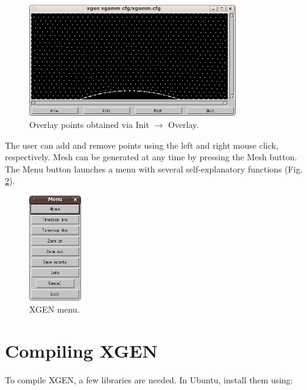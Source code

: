 \documentclass[12pt]{article}
\begin{document}
  \begin{figure}[!ht]
  \begin{center}
  \includegraphics[width=0.8\textwidth]{xgen-1.png}
  \end{center}
  \vspace{-6mm}
  \caption{Overlay points obtained via Init $\rightarrow$ Overlay.}
  \label{fig:overlay}
  \end{figure}
\noindent 
  The user can add and remove points using the left and right mouse click,
  respectively. Mesh can be generated at any time by pressing the Mesh button.
  The Menu button launches a menu with several self-explanatory functions
  (Fig. \ref{fig:menu}). 

  \begin{figure}[!ht]
  \begin{center}
  \includegraphics[width=0.2\textwidth]{xgen-3.png}
  \end{center}
  \vspace{-6mm}
  \caption{XGEN menu.}
  \label{fig:menu}
  \end{figure}
\noindent 


  \section{Compiling XGEN} \label{getting}
  
  To compile XGEN, a few libraries are needed. In Ubuntu, install them using:
\end{document}
